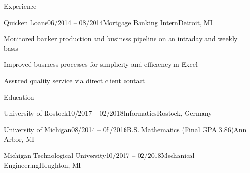 \documentclass{resume}
\begin{document}
\begin{cvSection}{Experience}
        \begin{cvSubsection}{Quicken Loans}{06/2014 -- 08/2014}{Mortgage Banking Intern}{Detroit, MI}
            \item Monitored banker production and business pipeline on an intraday and weekly basis
            \item Improved business processes for simplicity and efficiency in Excel
            \item Assured quality service via direct client contact
        \end{cvSubsection}

    \end{cvSection}

    \begin{cvSection}{Education}

        \begin{cvSubsection}{University of Rostock}{10/2017 -- 02/2018}{Informatics}{Rostock, Germany}
        \end{cvSubsection}

        \begin{cvSubsection}{University of Michigan}{08/2014 -- 05/2016}{B.S. Mathematics (Final GPA 3.86)}{Ann Arbor, MI}
        \end{cvSubsection}

        \begin{cvSubsection}{Michigan Technological University}{10/2017 -- 02/2018}{Mechanical Engineering}{Houghton, MI}
        \end{cvSubsection}

    \end {cvSection}
\end{document}
